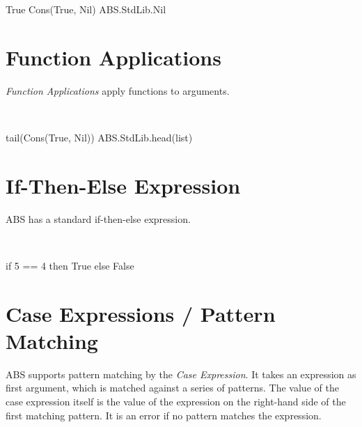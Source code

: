 \begin{absexample}
True
Cons(True, Nil)  
ABS.StdLib.Nil
\end{absexample}

\section{Function Applications}
\emph{Function Applications} apply functions to arguments.

\begin{abssyntax}
  {}\ \TRS{(}  \TRS{)}   
\end{abssyntax}

\begin{absexample}
tail(Cons(True, Nil))
ABS.StdLib.head(list)
\end{absexample}

\section{If-Then-Else Expression}
ABS has a standard if-then-else expression.

\begin{abssyntax}
   {}\ \  \  
\end{abssyntax}


\begin{absexample}
if 5 == 4 then True else False
\end{absexample}

\section{Case Expressions / Pattern Matching}
ABS supports pattern matching by the \emph{Case Expression}.  It takes
an expression as first argument, which is matched against a series of
patterns.  The value of the case expression itself is the value of the
expression on the right-hand side of the first matching pattern.
It is an error if no pattern matches the expression.


\begin{abssyntax}
        {}\ \ \TRS{\{} \ \TRS{\}}\\
     {}\ \TRS{=>}\ \ \TRS{;}\\
        {}
                  {}
                  {}
                  \TRS{\_}\\
  {}\ \\
    {}\ 
\end{abssyntax}

